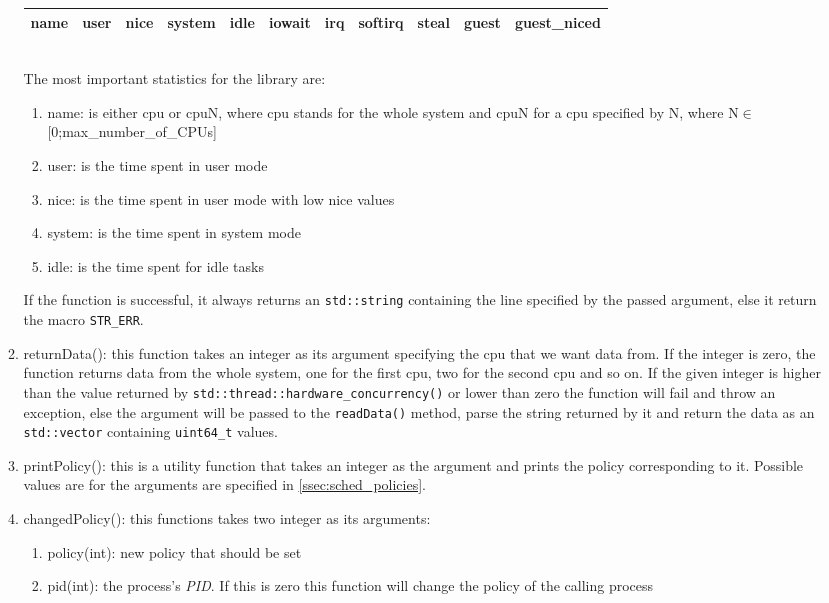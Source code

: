 \begin{enumerate}
\begin{enumerate}
		\begin{tabular}[h!]{ |c|c|c|c|c|c|c|c|c|c|c| }
				\hline
				name & user & nice & system & idle & iowait & irq & softirq & steal & guest & guest\_niced\\
				\hline
		\end{tabular}\\
		The most important statistics for the library are\cite{linux-man-proc}:
		\begin{enumerate}
			\item name: is either cpu or cpuN, where cpu stands for the whole system and cpuN for a cpu specified by N, where N$\in$ [0;max\_number\_of\_CPUs]
			\item user: is the time spent in user mode
			\item nice: is the time spent in user mode with low nice values
			\item system: is the time spent in system mode
			\item idle: is the time spent for idle tasks
		\end{enumerate}
			If the function is successful, it always returns an \texttt{std::string} containing the line specified by the passed argument, else it return the macro \texttt{STR\_ERR}.
		\item returnData(): this function takes an integer as its argument specifying the cpu that we want data from. If the integer is zero, the function returns data from the whole system, one for the first cpu, two for the second cpu and so on. If the given integer is higher than the value returned by \texttt{std::thread::hardware\_concurrency()} or lower than zero the function will fail and throw an exception, else the argument will be passed to the \texttt{readData()} method, parse the string returned by it and return the data as an \texttt{std::vector} containing \texttt{uint64\_t} values.
		\item printPolicy(): this is a utility function that takes an integer as the argument and prints the policy corresponding to it. Possible values are for the arguments are specified in \ref{ssec:sched_policies}.
		\item changedPolicy(): this functions takes two integer as its arguments:
		\begin{enumerate}
			\item policy(int): new policy that should be set
			\item pid(int): the process's \textit{PID}. If this is zero this function will change the policy of the calling process
		\end{enumerate}

\end{enumerate}
\end{enumerate}
